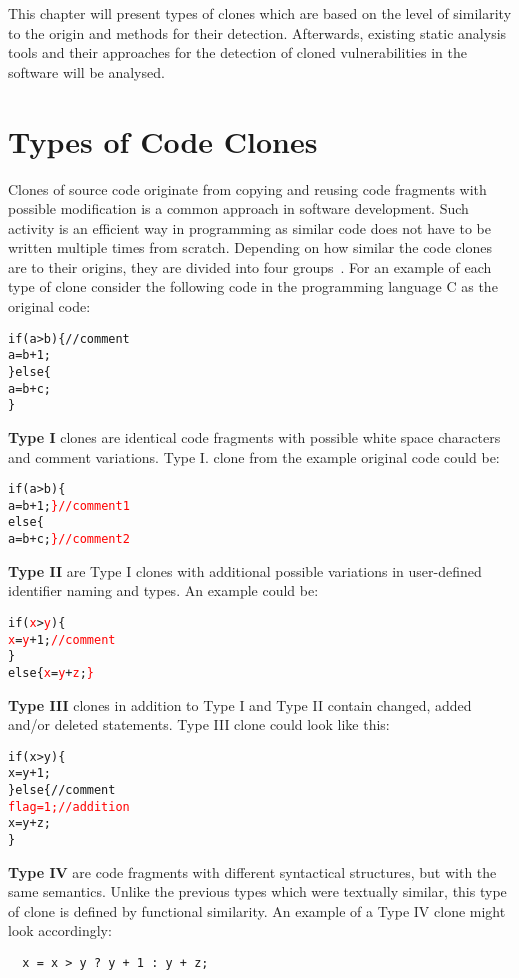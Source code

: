 This chapter will present types of clones which are based on the level of similarity to the origin and methods
for their detection. Afterwards, existing static analysis tools and their approaches for the detection of cloned
vulnerabilities in the software will be analysed.


\section{Types of Code Clones}
  Clones of source code originate from copying and reusing code fragments with possible modification
  is a common approach in software development. Such activity is an efficient way in programming as similar
  code does not have to be written multiple times from scratch. Depending on how similar the code clones are to
  their origins, they are divided into four groups~\cite{CodeClonesSurvey}. For an example of each type of clone
  consider the following code in the programming language C as the original code:
  \begin{alltt}
  if (a > b) \{  // comment
      a = b + 1;
  \} else \{
      a = b + c;
  \}
  \end{alltt}
  \textbf{Type I} clones are identical code fragments with possible white space characters and comment
  variations.
  Type I. clone from the example original code could be:
  \begin{alltt}
  if (a > b) \{
      a = b + 1; \textcolor{red}{\}  // comment 1}
  else \{
      a = b + c; \textcolor{red}{\}  // comment 2}
  \end{alltt}
  \textbf{Type II} are Type I clones with additional possible variations in user-defined identifier naming
  and types. An example could be:
  \begin{alltt}
  if (\textcolor{red}{x} > \textcolor{red}{y}) \{
      \textcolor{red}{x} = \textcolor{red}{y} + 1;  \textcolor{red}{// comment}
  \}
  else \{ \textcolor{red}{x} = \textcolor{red}{y} + \textcolor{red}{z}; \textcolor{red}{\}}
  \end{alltt}
  \textbf{Type III} clones in addition to Type I and Type II contain changed, added and/or deleted statements.
  Type III clone could look like this:
  \begin{alltt}
  if (x > y) \{
      x = y + 1;
  \} else \{  // comment
      \textcolor{red}{flag = 1;  // addition}
      x = y + z;
  \}
  \end{alltt}
  \textbf{Type IV} are code fragments with different syntactical structures, but with the same semantics. Unlike
  the previous types which were textually similar, this type of clone is defined by functional similarity.
  An example of a Type IV clone might look accordingly:
  \begin{verbatim}
  x = x > y ? y + 1 : y + z;
  \end{verbatim}

